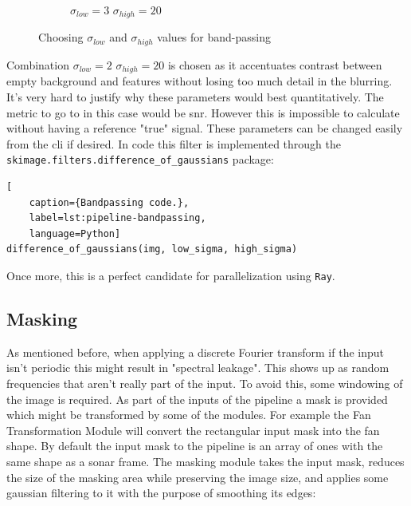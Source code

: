 \begin{figure}[H]
\begin{subfigure}[b]{.32\textwidth}
        \caption{\(\sigma_{low} = 3\) \(\sigma_{high} = 20\)}
    \end{subfigure}
    \caption{Choosing \(\sigma_{low}\) and \(\sigma_{high}\) values for band-passing}
\end{figure}

Combination \(\sigma_{low} = 2\) \(\sigma_{high} = 20\) is chosen as it accentuates contrast between empty background and features without losing too much detail in the blurring. It's very hard to justify why these parameters would best quantitatively. The metric to go to in this case would be \acrfull{snr}. However this is impossible to calculate without having a reference "true" signal. These parameters can be changed easily from the \acrshort{cli} if desired. In code this filter is implemented through the \texttt{skimage.filters.difference\_of\_gaussians} package:

\begin{lstlisting}[
    caption={Bandpassing code.},
    label=lst:pipeline-bandpassing,
    language=Python]
difference_of_gaussians(img, low_sigma, high_sigma)
\end{lstlisting}

Once more, this is a perfect candidate for parallelization using \texttt{Ray}.

\subsection{Masking}

As mentioned before, when applying a discrete Fourier transform if the input isn't periodic this might result in "spectral leakage". This shows up as random frequencies that aren't really part of the input. To avoid this, some windowing of the image is required. As part of the inputs of the pipeline a mask is provided which might be transformed by some of the modules. For example the Fan Transformation Module will convert the rectangular input mask into the fan shape. By default the input mask to the pipeline is an array of ones with the same shape as a sonar frame. The masking module takes the input mask, reduces the size of the masking area while preserving the image size, and applies some gaussian filtering to it with the purpose of smoothing its edges:

